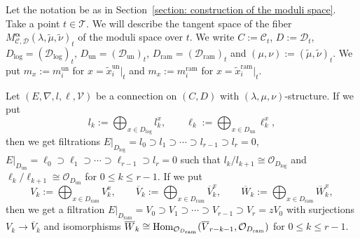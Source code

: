 \documentclass[pdftex]{sigma}
\numberwithin{equation}{section}
\newcommand\Hom{\mathop{\rm Hom}\nolimits}
\newcommand{\balpha}{\boldsymbol \alpha}
\begin{document}
Let the notation be as in Section~\ref{section: construction of the moduli space}.
Take a point $t\in{\mathcal T}$.
We will describe the tangent space of the fiber
$M^{\balpha}_{{\mathcal C},{\mathcal D}}(\lambda,\tilde{\mu},\tilde{\nu})_t$
of the moduli space over $t$.
We write
$C:={\mathcal C}_t$, $D:={\mathcal D}_t$,
$D_{\mathrm{log}}=({\mathcal D}_{\mathrm{log}})_t$,
$D_{\mathrm{un}}=({\mathcal D}_{\mathrm{un}})_t$,
$D_{\mathrm{ram}}=({\mathcal D}_{\mathrm{ram}})_t$
and
$(\mu,\nu):=(\tilde{\mu},\tilde{\nu})_t$.
We put
$m_x:=m^{\mathrm{un}}_i$ for $x=\tilde{x}^{\mathrm{un}}_i|_t$
and
$m_x:=m^{\mathrm{ram}}_i$ for $x=\tilde{x}^{\mathrm{ram}}_i|_t$.

Let
$(E,\nabla,l,\ell,{\mathcal V})$
be a connection on $(C,D)$ with
$(\lambda,\mu,\nu)$-structure.
If we put
\[
 l_k:=
 \bigoplus_{x\in D_{\mathrm{log}}} l^x_k,
 \qquad
 \ell_k
 :=
 \bigoplus_{x\in D_{\mathrm{un}}} \ell^x_k,
\]
then we get filtrations
$E|_{D_{\mathrm{log}}}=l_0\supset l_1\supset\cdots\supset l_{r-1}\supset l_r=0$,
$E|_{D_{\mathrm{un}}}=\ell_0\supset\ell_1\supset\cdots\supset\ell_{r-1}\supset l_r=0$
such that
$l_k/l_{k+1}\cong{\mathcal O}_{D_{\mathrm{log}}}$
and $\ell_k/\ell_{k+1}\cong{\mathcal O}_{D_{\mathrm{un}}}$
for $0\leq k\leq r-1$.
If we put
\[
 V_k:=
 \bigoplus_{x\in D_{\mathrm{ram}}} V^x_k,
 \qquad
 \overline{V}_k:=
 \bigoplus_{x\in D_{\mathrm{ram}}} \overline{V}^x_k,
 \qquad
 \overline{W}_k:=
 \bigoplus_{x\in D_{\mathrm{ram}}} \overline{W}^x_k,
\]
then we get a filtration
$E|_{D_{\mathrm{ram}}}=V_0\supset V_1\supset\cdots\supset V_{r-1}\supset V_r=zV_0$
with surjections $V_k\longrightarrow \overline{V}_k$
and isomorphisms
$\overline{W}_k\cong\Hom_{{\mathcal O}_{D_{\mathrm{ram}}}}
(\overline{V}_{r-k-1}, {\mathcal O}_{D_{\mathrm{ram}}} )$
for $0\leq k\leq r-1$.
\end{document}
